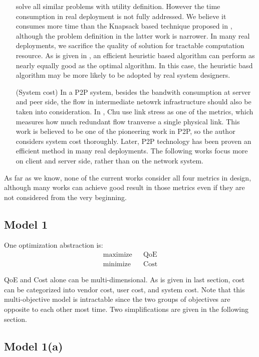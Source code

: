 \documentclass[11pt,a4paper]{article}
\begin{document}
\begin{itemize}
	solve all similar problems with utility definition. However the time consumption 
	in real deployment is not fully addressed. We believe it consumes 
	more time than the Knapsack based technique proposed in \cite{eberhard2010knapsack}, 
	although the problem definition in the latter work is narrower. In 
	many real deployments, we sacrifice the quality of solution for tractable 
	computation resource. As is given in \cite{eberhard2010knapsack}, an efficient 
	heuristic based algorithm can perform as nearly equally good as the optimal 
	algorithm. In this case, the heuristic basd algorithm may be more likely 
	to be adopted by real system designers. 
	\item [(System cost)] In a P2P system, besides the bandwith consumption at 
	server and peer side, the flow in intermediate netowrk infrastructure 
	should also be taken into consideration. In \cite{chu2001case}, Chu use
	link stress as one of the metrics, which measures how much redundant flow
	tranverse a single physical link. This work is believed to be one of the 
	pioneering work in P2P, so the author considers system cost thoroughly. 
	Later, P2P technology has been proven an efficient method in many real 
	deployments. The following works focus more on client and server side, rather
	than on the network system. 
\end{itemize}

As far as we know, none of the current works consider 
all four metrics in design, although many works can achieve 
good result in those metrics even if they are not considered 
from the very beginning. 

\subsection{Model 1}

One optimization abstraction is:
\begin{eqnarray}
	\text{maximize}&& \text{QoE} \\
	\text{minimize}&& \text{Cost} \nonumber 
\end{eqnarray}

QoE and Cost alone can be multi-dimensional. As is given in last 
section, cost can be categorized into vendor cost, user cost, and 
system cost. Note that this multi-objective model is intractable 
since the two groups of objectives are opposite to each other 
most time. Two simplifications are given in the following section. 

\subsection{Model 1(a)}
\end{document}
